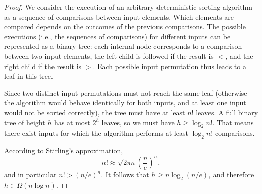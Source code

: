 \begin{proof}
We consider the execution of an arbitrary deterministic sorting algorithm
as a sequence of comparisons between input elements.
Which elements are compared depends on the outcomes of the previous comparisons.
The possible executions (i.e., the sequences of comparisons) for different inputs
can be represented as a binary tree:
each internal node corresponds to a comparison between two input elements,
the left child is followed if the result is $<$,
and the right child if the result is $>$.
Each possible input permutation thus leads to a leaf in this tree.

Since two distinct input permutations must not reach the same leaf
(otherwise the algorithm would behave identically for both inputs,
and at least one input would not be sorted correctly),
the tree must have at least $n!$ leaves.
A full binary tree of height $h$ has at most $2^h$ leaves,
so we must have $h \ge \log_2 n!$.
That means there exist inputs for which the algorithm performs
at least $\log_2 n!$ comparisons.

According to Stirling’s approximation,
\[
n! \approx \sqrt{2 \pi n} \left(\frac{n}{e}\right)^n,
\]
and in particular $n! > (n/e)^n$.
It follows that $h \ge n \log_2 (n/e)$,
and therefore $h \in \Omega(n \log n)$.
\end{proof}
